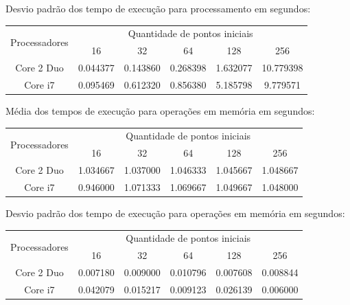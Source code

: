     \noindent Desvio padrão dos tempo de execução para processamento em segundos:\\
    \begin{scriptsize}
    \begin{tabular}{| c | c | c | c | c | c |}
      \hline
      \multirow{2}{*}{Processadores}& \multicolumn{5}{|c|}{Quantidade de pontos iniciais} \\ \cline{2-6}
      & 16 & 32 & 64 & 128 & 256 \\ \hline
      Core 2 Duo & 0.044377 & 0.143860 & 0.268398 & 1.632077 & 10.779398 \\ \hline
      Core i7 &  0.095469 & 0.612320 & 0.856380 & 5.185798 & 9.779571 \\ \hline

      \hline
    \end{tabular}
    \end{scriptsize}
    
    \hspace{1mm}\newline
    
    \noindent Média dos tempos de execução para operações em memória em segundos:\\
    \begin{scriptsize}
    \begin{tabular}{| c | c | c | c | c | c |}
      \hline
      \multirow{2}{*}{Processadores}& \multicolumn{5}{|c|}{Quantidade de pontos iniciais} \\ \cline{2-6}
      & 16 & 32 & 64 & 128 & 256 \\ \hline
      Core 2 Duo & 1.034667 & 1.037000 & 1.046333 & 1.045667 & 1.048667\\ \hline
      Core i7 & 0.946000 & 1.071333 & 1.069667 & 1.049667 & 1.048000\\ \hline

      \hline
    \end{tabular}
    \end{scriptsize}
    
    \hspace{1mm}\newline
    
    \noindent Desvio padrão dos tempo de execução para operações em memória em segundos:\\
    \begin{scriptsize}
    \begin{tabular}{| c | c | c | c | c | c |}
      \hline
      \multirow{2}{*}{Processadores}& \multicolumn{5}{|c|}{Quantidade de pontos iniciais} \\ \cline{2-6}
      & 16 & 32 & 64 & 128 & 256 \\ \hline
      Core 2 Duo & 0.007180 & 0.009000 & 0.010796 & 0.007608 & 0.008844\\ \hline
      Core i7 & 0.042079 & 0.015217 & 0.009123 & 0.026139 & 0.006000 \\ \hline

      \hline
    \end{tabular}
    \end{scriptsize}
    

